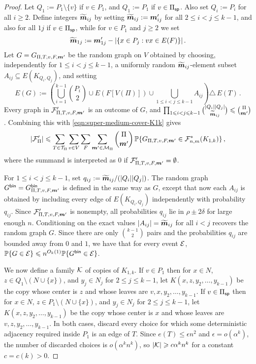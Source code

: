 \begin{proof}
Let $Q_1:=P_1\setminus\{v\}$ if $v\in P_1$, and $Q_1:=P_1$ if $v\in\Pi_{\mathsf{sp}}$. Also set $Q_i:=P_i$ for all $i\geq2$. Define integers $\widetilde{\boldsymbol{m}}_{ij}$ by setting $\widetilde{\boldsymbol{m}}_{ij}:=\boldsymbol{m}'_{ij}$ for all $2\leq i<j\leq k-1$, and also for all $1j$ if $v\in\Pi_{\mathsf{sp}}$, while for $v\in P_1$ and $j\geq2$ we set
$$\widetilde{\boldsymbol{m}}_{1j}:=\boldsymbol{m}'_{1j}-\lvert\{x\in P_j:vx\in E(F)\}\rvert\,.$$
Let $G=G_{\Pi,T,v,F,\boldsymbol{m}'}$ be the random graph on $V$ obtained by choosing, independently for $1\leq i<j\leq k-1$, a uniformly random $\widetilde{\boldsymbol{m}}_{ij}$-element subset $A_{ij}\subseteq E(K_{Q_i,Q_j})$, and setting
\begin{equation}\label{eqn:super-fixed-model-medium-K1k}
E(G):=\left(\bigcup_{i=1}^{k-1}\binom{P_i}{2}\cup E(F[V(\Pi)])\cup\bigcup_{1\leq i<j\leq k-1}A_{ij}\right)\triangle\,E(T)\,.
\end{equation}
Every graph in ${\mathcal F}'_{\Pi,T,v,F,\boldsymbol{m}'}$ is an outcome of $G$, and $\prod_{1\leqslant i<j\leqslant k-1}\binom{|Q_i||Q_j|}{\widetilde{\boldsymbol{m}}_{ij}}\leqslant\binom{\Pi}{\boldsymbol{m}'}$. Combining this with \eqref{eqn:super-medium-cover-K1k} gives
\begin{equation}\label{eqn:super-medium-counting-setup-K1k}
\lvert{\mathcal F}'_\Pi\rvert\leqslant \sum_{T\in{\mathcal T}_\Pi}\sum_{v\in V}\sum_F\sum_{\boldsymbol{m}'\in{\mathcal M}_\Pi}\binom{\Pi}{\boldsymbol{m}'}\,{\mathbb P}\{G_{\Pi,T,v,F,\boldsymbol{m}'}\in{\mathcal F}^\ast_{n,m}(K_{1,k})\}\,,
\end{equation}
where the summand is interpreted as $0$ if ${\mathcal F}'_{\Pi,T,v,F,\boldsymbol{m}'}=\emptyset$.

For $1\leq i<j\leq k-1$, set $q_{ij}:=\widetilde{\boldsymbol{m}}_{ij}/(|Q_i||Q_j|)$. The random graph $G^{\mathsf{bin}}=G^{\mathsf{bin}}_{\Pi,T,v,F,\boldsymbol{m}'}$ is defined in the same way as $G$, except that now each $A_{ij}$ is obtained by including every edge of $E(K_{Q_i,Q_j})$ independently with probability $q_{ij}$.
Since ${\mathcal F}'_{\Pi,T,v,F,\boldsymbol{m}'}$ is nonempty, all probabilities $q_{ij}$ lie in $\rho\pm2\delta$ for large enough $n$. Conditioning on the exact values $|A_{ij}|=\widetilde{\boldsymbol{m}}_{ij}$ for all $i<j$ recovers the random graph $G$. Since there are only $\binom{k-1}{2}$ pairs and the probabilities $q_{ij}$ are bounded away from $0$ and $1$, we have that for every event ${\mathcal E}$, ${\mathbb P}\{G\in{\mathcal E}\}\leqslant n^{O_k(1)}{\mathbb P}\{G^{\mathsf{bin}}\in{\mathcal E}\}$.

We now define a family ${\mathcal K}$ of copies of $K_{1,k}$. If $v\in P_1$ then for $x\in N$, $z\in Q_1\setminus(N\cup\{x\})$, and $y_j\in N_j$ for $2\leq j\leq k-1$, let $K(x,z,y_2,\dots,y_{k-1})$ be the copy whose center is $z$ and whose leaves are $v,x,y_2,\dots,y_{k-1}$. If $v\in\Pi_{\mathsf{sp}}$ then for $x\in N$, $z\in P_1\setminus(N\cup\{x\})$, and $y_j\in N_j$ for $2\leq j\leq k-1$, let $K(x,z,y_2,\dots,y_{k-1})$ be the copy whose center is $x$ and whose leaves are $v,z,y_2,\dots,y_{k-1}$. In both cases, discard every choice for which some deterministic adjacency required inside $P_1$ is an edge of $T$. Since $e(T)\leq\epsilon n^2$ and $\epsilon=o(\alpha^k)$, the number of discarded choices is $o(\alpha^k n^k)$, so $|{\mathcal K}|\geqslant c\alpha^kn^k$ for a constant $c=c(k)>0$.


\end{proof}
